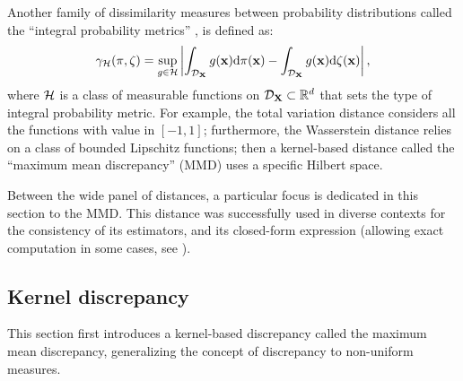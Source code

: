 Another family of dissimilarity measures between probability distributions called the ``integral probability metrics'' \citep{muller_1997_ipm}, is defined as: 
\begin{equation}
    \gamma_{\mathcal{H}}(\pi, \zeta) = \sup_{g \in \mathcal{H}} \left | \int_{\mathcal{D}_{{\bf X}}} g({\bf x}) \mathrm{d} \pi({\bf x}) - \int_{\mathcal{D}_{{\bf X}}} g({\bf x}) \mathrm{d} \zeta({\bf x}) \right|,
    \label{eq:ipm}  
\end{equation}
where $\mathcal{H}$ is a class of measurable functions on $\mathcal{D}_{{\bf X}} \subset \mathbb{R}^d$ that sets the type of integral probability metric.   
For example, the total variation distance considers all the functions with value in $[-1, 1]$; 
furthermore, the Wasserstein distance relies on a class of bounded Lipschitz functions; 
then a kernel-based distance called the ``maximum mean discrepancy'' (MMD) uses a specific Hilbert space. 

Between the wide panel of distances\footnotemark, a particular focus is dedicated in this section to the MMD. 
This distance was successfully used in diverse contexts for the consistency of its estimators, and its closed-form expression (allowing exact computation in some cases, see \citealp{sriperumbudur_2012}). 




\subsection*{Kernel discrepancy}

This section first introduces a kernel-based discrepancy called the maximum mean discrepancy, generalizing the concept of discrepancy to non-uniform measures.

